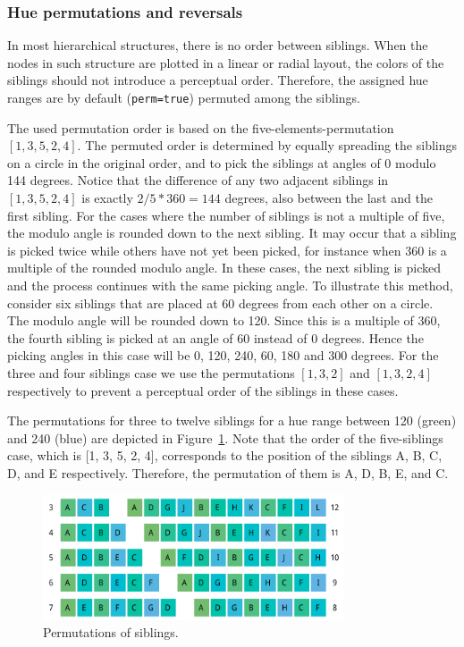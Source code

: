 \documentclass[journal]{vgtc}                %
\begin{document}
\subsubsection{Hue permutations and reversals}\label{sechueperm}

In most hierarchical structures, there is no order between siblings. 
When the nodes in such structure are plotted in a linear or radial layout, 
the colors of the siblings should not introduce a perceptual order. Therefore, the assigned hue 
ranges are by default (\texttt{perm=true}) permuted among the siblings. 


The used permutation order is based on the five-elements-permutation $[1, 3, 5, 2, 4]$. The permuted order is determined by equally spreading the siblings on a circle in the original order, and to pick the siblings at angles of 0 modulo 144 degrees. Notice that the difference of any two adjacent siblings in $[1, 3, 5, 2, 4]$ is exactly $2/5 * 360=144$ degrees, also between the last and the first sibling. For the cases where the number of siblings is not a multiple of five, the modulo angle is rounded down to the next sibling. It may occur that a sibling is picked twice while others have not yet been picked, for instance when 360 is a multiple of the rounded modulo angle. In these cases, the next sibling is picked and the process continues with the same picking angle. To illustrate this method, consider six siblings that are placed at 60 degrees from each other on a circle. The modulo angle will be rounded down to 120. Since this is a multiple of 360, the fourth sibling is picked at an angle of 60 instead of 0 degrees. Hence the picking angles in this case will be 0, 120, 240, 60, 180 and 300 degrees. For the three and four siblings case we use the permutations $[1, 3, 2]$ and $[1, 3, 2, 4]$ respectively to prevent a perceptual order of the siblings in these cases.


The permutations for three to twelve siblings for a hue range between 120 (green) and 240 (blue) are depicted in Figure~\ref{fig:perm}. Note that the order of the five-siblings case, which is [1, 3, 5, 2, 4], corresponds to the position of the siblings A, B, C, D, and E respectively. Therefore, the permutation of them is A, D, B, E, and C. 

\begin{figure}[tb]
  \centering
  \includegraphics[width=3.5in]{Permutations.pdf}
  \caption{Permutations of siblings.}\label{fig:perm}
\end{figure}
\end{document}
